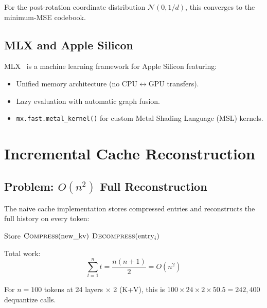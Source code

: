 \documentclass[11pt,a4paper]{article}
\begin{document}
For the post-rotation coordinate distribution $\mathcal{N}(0, 1/d)$, this converges to the minimum-MSE codebook.

\subsection{MLX and Apple Silicon}

MLX~\cite{apple2023mlx} is a machine learning framework for Apple Silicon featuring:
\begin{itemize}
  \item Unified memory architecture (no CPU$\leftrightarrow$GPU transfers).
  \item Lazy evaluation with automatic graph fusion.
  \item \texttt{mx.fast.metal\_kernel()} for custom Metal Shading Language (MSL) kernels.
\end{itemize}

\section{Incremental Cache Reconstruction}

\subsection{Problem: $O(n^2)$ Full Reconstruction}

The naive cache implementation stores compressed entries and reconstructs the full history on every token:

\begin{algorithm}[H]
\caption{Naive Full Reconstruction}
\begin{algorithmic}[1]
  \STATE Store $\textsc{Compress}(\text{new\_kv})$
    \STATE $\textsc{Decompress}(\text{entry}_i)$ 
  \ENDFOR
\ENDFOR
\end{algorithmic}
\end{algorithm}

Total work:
\begin{equation}
  \sum_{t=1}^{n} t = \frac{n(n+1)}{2} = O(n^2)
\end{equation}

For $n = 100$ tokens at 24 layers $\times$ 2 (K+V), this is $100 \times 24 \times 2 \times 50.5 = 242{,}400$ dequantize calls.
\end{document}
